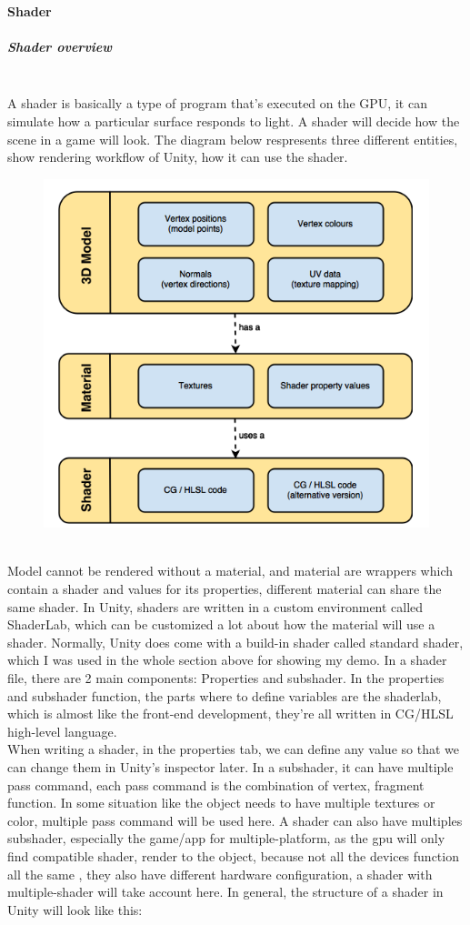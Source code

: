 \documentclass[a4paper, 13pt]{extarticle}
\begin{document}
{ \paragraph{Shader} \vspace{-0.2cm}
 \subparagraph{Shader overview} ~\\[0.1cm]
 A shader is basically a type of program that's executed on the GPU, it can simulate how a particular surface responds to light. A shader will decide how the scene in a game will look. The diagram below respresents three different entities, show rendering workflow of Unity, how it can use the shader. 
 \begin{figure}[h]
 		\begin{minipage}{1\textwidth}
 			\centering
 			\includegraphics[width=0.45\linewidth]{intructions/Shader_workflow.png}
 			\centering
 		\end{minipage}
 \end{figure}
\\[0.01cm]
   Model cannot be rendered without a material, and material are wrappers which contain a shader and values for its properties, different material can share the same shader. In Unity, shaders are written in a custom environment called ShaderLab, which can be customized a lot about how the material will use a shader. Normally, Unity does come with a build-in shader called standard shader, which I was used in the whole section above for showing my demo. In a shader file, there are 2 main components: Properties and subshader. In the properties and subshader function, the parts where to define variables are the shaderlab, which is almost like the front-end development, they're all written in CG/HLSL high-level language. \\
   When writing a shader, in the properties tab, we can define any value  so that we can change them in Unity's inspector later. In a subshader, it can have multiple pass command, each pass command is the combination of vertex, fragment function. In some situation like the object needs to have multiple textures or color, multiple pass command will be used here. A shader can also have multiples subshader, especially the game/app for multiple-platform, as the gpu will only find compatible shader, render to the object, because not all the devices function all the same , they also have different hardware configuration, a shader with multiple-shader will take account here. In general, the structure of a shader in Unity will look like this: 
}
\end{document}
